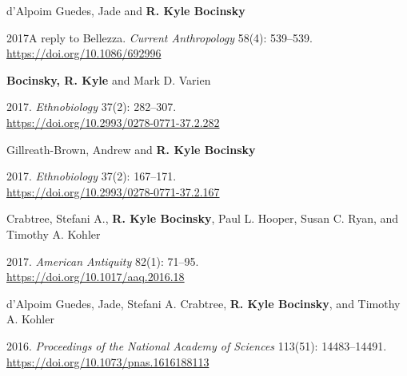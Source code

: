 d'Alpoim Guedes, Jade and {\bf R. Kyle Bocinsky}
\begin{list1}
\item[] 2017\hspace{.2cm}A reply to Bellezza. \emph{Current Anthropology} 58(4): 539–539.\\\href{https://doi.org/10.1086/692996}{https://doi.org/10.1086/692996}
\end{list1}


{\bf Bocinsky, R. Kyle} and Mark D. Varien
\begin{list1}
\item[] 2017\hspace{.2cm}{Calibrating Maize Paleoproduction Models using Experimental Data}. \emph{Ethnobiology} 37(2): 282–307.\\\href{https://doi.org/10.2993/0278-0771-37.2.282}{https://doi.org/10.2993/0278-0771-37.2.282}
\end{list1}

\newpage
Gillreath-Brown, Andrew and {\bf R. Kyle Bocinsky}
\begin{list1}
\item[] 2017\hspace{.2cm}{A Dialogue Between Empirical and Model-Based Agricultural Studies in Archaeology}. \emph{Ethnobiology} 37(2): 167–171.\\\href{https://doi.org/10.2993/0278-0771-37.2.167}{https://doi.org/10.2993/0278-0771-37.2.167}
\end{list1}


Crabtree, Stefani A., {\bf R. Kyle Bocinsky}, Paul L. Hooper, Susan C. Ryan, and Timothy A. Kohler
\begin{list1}
\item[] 2017\hspace{.2cm}{How to make a polity (in the central Mesa Verde region)}. \emph{American Antiquity} 82(1): 71–95.\\\href{https://doi.org/10.1017/aaq.2016.18}{https://doi.org/10.1017/aaq.2016.18}
\end{list1}


d'Alpoim Guedes, Jade, Stefani A. Crabtree, {\bf R. Kyle Bocinsky}, and Timothy A. Kohler 
\begin{list1}
\item[] 2016. \emph{Proceedings of the National Academy of Sciences} 113(51): 14483–14491.\\\href{https://doi.org/10.1073/pnas.1616188113}{https://doi.org/10.1073/pnas.1616188113}
\end{list1}



